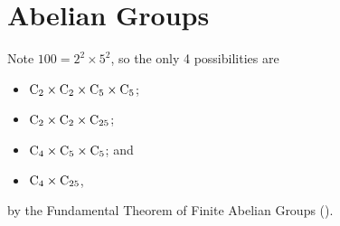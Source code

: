 \section{Abelian Groups}
\begin{questions}
    \item Note $100 = 2^2 \times 5^2$, so the only 4 possibilities are
    \begin{itemize}
        \item $\mathrm{C}_{2} \times \mathrm{C}_{2} \times \mathrm{C}_{5} \times \mathrm{C}_{5}$;
        \item $\mathrm{C}_{2} \times \mathrm{C}_{2} \times \mathrm{C}_{25}$;
        \item $\mathrm{C}_{4} \times \mathrm{C}_{5} \times \mathrm{C}_{5}$; and
        \item $\mathrm{C}_{4} \times \mathrm{C}_{25}$,
    \end{itemize}
    by the Fundamental Theorem of Finite Abelian Groups ().
\end{questions}
